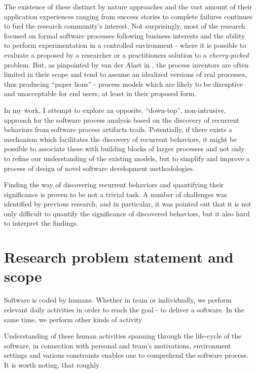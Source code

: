 The existence of these distinct by nature approaches and the vast amount of their application experiences 
ranging from success stories to complete failures continues to fuel the research community's interest. 
Not surprisingly, most of the research focused on formal software processes following business 
interests and the ability to perform experimentation in a controlled environment - where it is possible
to evaluate a proposed by a researcher or a practitioners solution to a \textit{cherry-picked} problem. 
But, as pinpointed by  van der Alast in \cite{citeulike:9758924}, the process inventors are often limited in their
scope and tend to assume an idealized versions of real processes, thus producing ``paper lions'' - 
process models which are likely to be disruptive and unacceptable for end users, at least in their proposed form.

In my work, I attempt to explore an opposite, ``down-top'', non-intrusive, approach for the software 
process analysis based on the discovery of recurrent behaviors from software process artifacts trails. 
Potentially, if there exists a mechanism which facilitates the discovery of recurrent behaviors, 
it might be possible to associate these with building blocks of larger processes and not only to 
refine our understanding of the existing models, but to simplify and improve a process of design of 
novel software development methodologies.

Finding the way of discovering recurrent behaviors and quantifying their significance is proven to be 
not a trivial task. A number of challenges was identified by previous research, and in particular, it
was pointed out that it is not only difficult to quantify the significance of discovered behaviors, 
but it also hard to interpret the findings. 

\section{Research problem statement and scope}
Software is coded by humans. Whether in team or individually, we perform relevant daily activities 
in order to reach the goal - to deliver a software. In the same time, we perform other kinds of activity

Understanding of these human activities spanning through the life-cycle of the software, 
in connection with personal and team's motivations, environment settings and various constraints enables one to
comprehend the software process. It is worth noting, that roughly 

